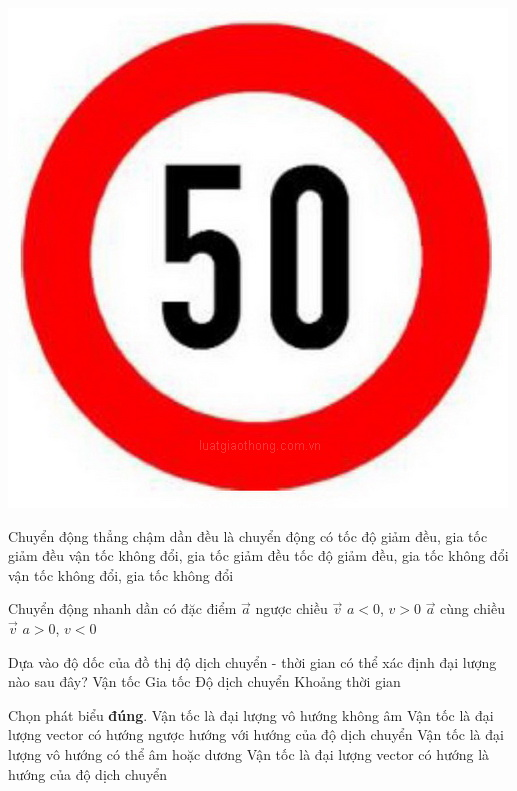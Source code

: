 \begin{ex}
	{
	\includegraphics[width=0.4\linewidth]{../figs/D10-1-6}
	}
	\loigiai{}
\end{ex}
\begin{ex}
	Chuyển động thẳng chậm dần đều là chuyển động có
	\choice
	{tốc độ giảm đều, gia tốc giảm đều}
	{vận tốc không đổi, gia tốc giảm đều}
	{\True tốc độ giảm đều, gia tốc không đổi}
	{vận tốc không đổi, gia tốc không đổi}
	\loigiai{}
\end{ex}
\begin{ex}
	Chuyển động nhanh dần có đặc điểm
	\choice
	{$\vec{a}$ ngược chiều $\vec{v}$}
	{$a<0$, $v>0$}
	{\True $\vec{a}$ cùng chiều $\vec{v}$}
	{$a>0$, $v<0$}
	\loigiai{}
\end{ex}
\begin{ex}
	Dựa vào độ dốc của đồ thị độ dịch chuyển - thời gian có thể xác định đại lượng nào sau đây?
	\choice
	{\True Vận tốc}
	{Gia tốc}
	{Độ dịch chuyển}
	{Khoảng thời gian}
	\loigiai{}
\end{ex}
\begin{ex}
	Chọn phát biểu \textbf{đúng}.
	\choice
	{Vận tốc là đại lượng vô hướng không âm}
	{Vận tốc là đại lượng vector có hướng ngược hướng với hướng của độ dịch chuyển}
	{Vận tốc là đại lượng vô hướng có thể âm hoặc dương}
	{\True Vận tốc là đại lượng vector có hướng là hướng của độ dịch chuyển}
	\loigiai{}
\end{ex}

